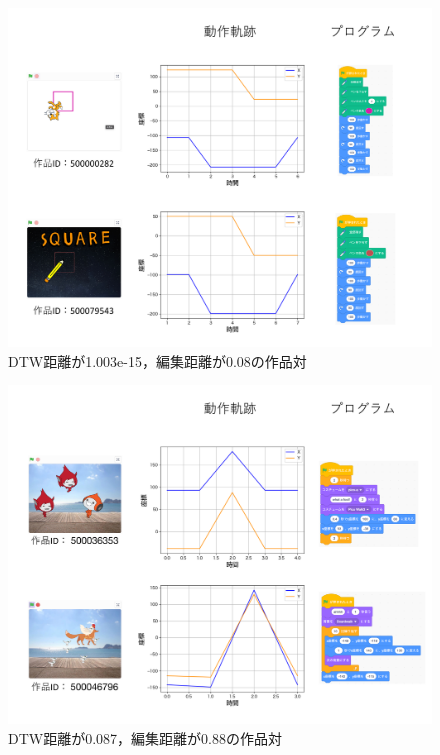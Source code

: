\documentclass[T,J]{fose} %
\begin{document}
\begin{figure}[t]
	\centering
	\includegraphics[width=1.0\linewidth]{Okamoto_fig/quadrant-3.pdf}
	\caption{DTW距離が1.003e-15，編集距離が0.08の作品対}
	\label{fig:distance-boxplot}
\end{figure}

\begin{figure}[t]
	\centering
	\includegraphics[width=1.0\linewidth]{Okamoto_fig/quadrant-4.pdf}
	\caption{DTW距離が0.087，編集距離が0.88の作品対}
	\label{fig:distance-boxplot}
\end{figure}
\end{document}
